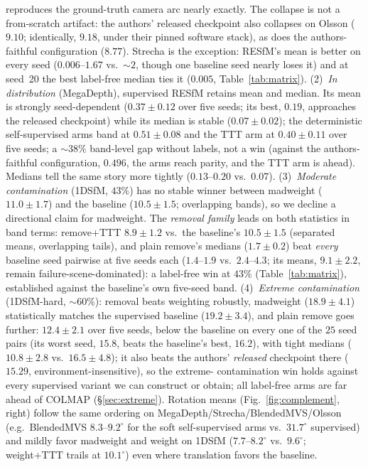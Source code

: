\documentclass{article}
\newcommand{\mad}{madweight}
\renewcommand{\deg}{^{\circ}}
\begin{document}
reproduces the ground-truth camera arc nearly exactly. The collapse is not a from-scratch artifact: the authors' released
checkpoint also collapses on Olsson ($9.10$; identically, $9.18$, under their pinned
software stack), as does the authors-faithful configuration ($8.77$). Strecha is the exception: RESfM's mean is better on every seed
($0.006$--$1.67$ vs.\ $\sim\!2$, though one baseline seed nearly loses it) and at
seed~20 the best label-free median ties it ($0.005$, Table~\ref{tab:matrix}).
(2)~\emph{In distribution} (MegaDepth), supervised RESfM retains mean and median.
Its mean is strongly seed-dependent ($0.37\pm0.12$ over five seeds; its best, $0.19$,
approaches the released checkpoint) while its median is stable ($0.07\pm0.02$); the
deterministic self-supervised arms band at $0.51\pm0.08$ and the TTT arm at
$0.40\pm0.11$ over five seeds; a $\sim\!38\%$ band-level gap without labels, not a win
(against the authors-faithful configuration, $0.496$, the arms reach parity, and the TTT
arm is ahead). Medians tell the same story more tightly ($0.13$--$0.20$ vs.\ $0.07$).
(3)~\emph{Moderate contamination} (1DSfM, $43\%$) has no stable winner between \mad{}
($11.0\pm1.7$) and the baseline ($10.5\pm1.5$; overlapping bands), so we decline a
directional claim for \mad{}. The \emph{removal family} leads on both statistics in
band terms: remove+TTT $8.9\pm1.2$ vs.\ the baseline's $10.5\pm1.5$ (separated means,
overlapping tails), and plain remove's medians ($1.7\pm0.2$) beat \emph{every} baseline
seed pairwise at five seeds each ($1.4$--$1.9$ vs.\ $2.4$--$4.3$; its means, $9.1\pm2.2$,
remain failure-scene-dominated): a label-free win at $43\%$ (Table~\ref{tab:matrix}),
established against the baseline's own five-seed band.
(4)~\emph{Extreme contamination} (1DSfM-hard, ${\sim}60\%$): removal beats weighting
robustly, \mad{} ($18.9\pm4.1$) statistically matches the supervised baseline
($19.2\pm3.4$), and plain remove goes further: $12.4\pm2.1$ over five seeds, below the
baseline on every one of the $25$ seed pairs (its worst seed, $15.8$, beats the
baseline's best, $16.2$), with tight medians ($10.8\pm2.8$ vs.\ $16.5\pm4.8$); it also beats the authors'
\emph{released} checkpoint there ($15.29$, environment-insensitive), so the extreme-%
contamination win holds against every supervised variant we can construct or obtain; all
label-free arms are far ahead of COLMAP (\S\ref{sec:extreme}). Rotation means (Fig.~\ref{fig:complement}, right) follow the same ordering on
MegaDepth/Strecha/BlendedMVS/Olsson (e.g.\ BlendedMVS $8.3$--$9.2\deg$ for the soft self-supervised arms
vs.\ $31.7\deg$ supervised) and mildly favor madweight and weight on 1DSfM
($7.7$--$8.2\deg$ vs.\ $9.6\deg$; weight+TTT trails at $10.1\deg$) even where translation
favors the baseline. 
\end{document}
